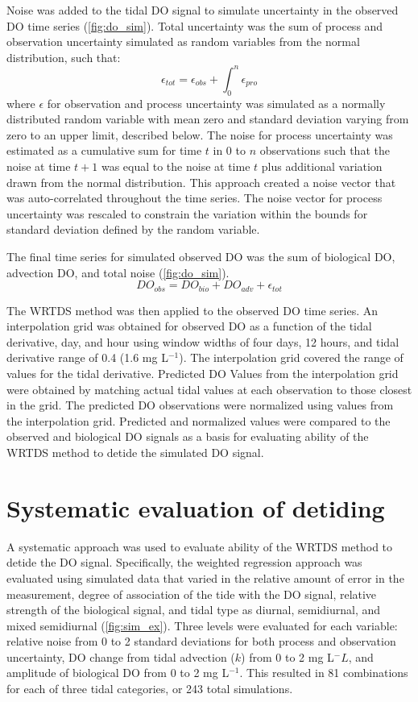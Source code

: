 \documentclass{article}\usepackage{graphicx, color}
\begin{document}
Noise was added to the tidal DO signal to simulate uncertainty in the observed DO time series (\cref{fig:do_sim}).  Total uncertainty was the sum of process and observation uncertainty simulated as random variables from the normal distribution, such that:
\begin{equation}
\epsilon _{tot} = \epsilon _{obs} + \int_0^n \epsilon _{pro}
\end{equation}
where $\epsilon$ for observation and process uncertainty was simulated as a normally distributed random variable with mean zero and standard deviation varying from zero to an upper limit, described below.  The noise for process uncertainty was estimated as a cumulative sum for time $t$ in 0 to $n$ observations such that the noise at time $t+1$ was equal to the noise at time $t$ plus additional variation drawn from the normal distribution.  This approach created a noise vector that was auto-correlated throughout the time series.  The noise vector for process uncertainty was rescaled to constrain the variation within the bounds for standard deviation defined by the random variable.    

The final time series for simulated observed DO was the sum of biological DO, advection DO, and total noise (\cref{fig:do_sim}).
\begin{equation}
DO_{obs} = DO_{bio} + DO_{adv} + \epsilon _{tot}
\end{equation}

The WRTDS method was then applied to the observed DO time series.  An interpolation grid was obtained for observed DO as a function of the tidal derivative, day, and hour using window widths of four days, 12 hours, and tidal derivative range of 0.4 (1.6 mg L$^{-1}$).  The interpolation grid covered the range of values for the tidal derivative.  Predicted DO Values from the interpolation grid were obtained by matching actual tidal values at each observation to those closest in the grid.  The predicted DO observations were normalized using values from the interpolation grid.  Predicted and normalized values were compared to the observed and biological DO signals as a basis for evaluating ability of the WRTDS method to detide the simulated DO signal.  

\section{Systematic evaluation of detiding}

A systematic approach was used to evaluate ability of the WRTDS method to detide the DO signal.  Specifically, the weighted regression approach was evaluated using simulated data that varied in the relative amount of error in the measurement, degree of association of the tide with the DO signal, relative strength of the biological signal, and tidal type as diurnal, semidiurnal, and mixed semidiurnal (\cref{fig:sim_ex}).  Three levels were evaluated for each variable: relative noise from 0 to 2 standard deviations for both process and observation uncertainty, DO change from tidal advection ($k$) from 0 to 2 mg L$^-L$, and amplitude of biological DO from 0 to 2 mg L$^{-1}$.  This resulted in 81 combinations for each of three tidal categories, or 243 total simulations. 
\end{document}
